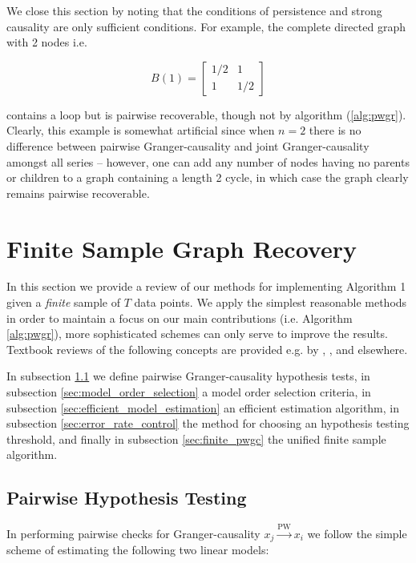 \documentclass[12pt]{article}
\def\pwgc{\overset{\text{PW}}{\rightarrow}}  %
\begin{document}
\begin{example}
  We close this section by noting that the conditions of persistence
  and strong causality are only sufficient conditions.  For example,
  the complete directed graph with 2 nodes i.e.

  \begin{equation*}
    B(1) = \left[ \begin{array}{cc} 1/2 & 1 \\ 1 & 1/2 \end{array}\right]
  \end{equation*}

  contains a loop but is pairwise recoverable, though not by algorithm
  (\ref{alg:pwgr}).  Clearly, this example is somewhat artificial
  since when $n = 2$ there is no difference between pairwise
  Granger-causality and joint Granger-causality amongst all series --
  however, one can add any number of nodes having no parents or
  children to a graph containing a length 2 cycle, in which case the
  graph clearly remains pairwise recoverable.
\end{example}

\section{Finite Sample Graph Recovery}
\label{sec:structure_learning}
In this section we provide a review of our methods for implementing
Algorithm 1 given a \textit{finite} sample of $T$ data points.  We
apply the simplest reasonable methods in order to maintain a focus on
our main contributions (i.e. Algorithm \ref{alg:pwgr}), more
sophisticated schemes can only serve to improve the results.  Textbook
reviews of the following concepts are provided e.g. by
\cite{all_of_statistics}, \cite{murphy_mlp}, and elsewhere.

In subsection \ref{sec:pairwise_hypothesis_testing} we define pairwise
Granger-causality hypothesis tests, in subsection
\ref{sec:model_order_selection} a model order selection criteria, in
subsection \ref{sec:efficient_model_estimation} an efficient
estimation algorithm, in subsection \ref{sec:error_rate_control} the
method for choosing an hypothesis testing threshold, and finally in
subsection \ref{sec:finite_pwgc} the unified finite sample algorithm.

\subsection{Pairwise Hypothesis Testing}
\label{sec:pairwise_hypothesis_testing}
In performing pairwise checks for Granger-causality $x_j \pwgc x_i$ we
follow the simple scheme of estimating the following two linear models:
\end{document}
